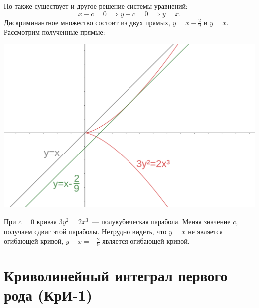 \documentclass[../../main.tex]{subfiles}
\begin{document}
\begin{exmps}
\begin{enumerate}
Но также существует и другое решение системы уравнений:  \[x-c = 0 \implies y 
- c = 0 \implies y = x. \]
Дискриминантное множество состоит из двух прямых, $y  = x - \frac{2}{9}$ и 
$y=x$. Рассмотрим полученные прямые:
\begin{center} \includegraphics[scale=0.5]{hiperbola.png} \end{center}

При $c=0$ кривая $3y^2 = 2x^3$~--- полукубическая парабола. Меняя значение 
$c$, получаем сдвиг этой параболы.
Нетрудно видеть, что $y = x$ не является огибающей кривой, $y - x = 
-\frac{2}{9}$ является огибающей кривой.

\end{enumerate}
\end{exmps}

\section{Криволинейный интеграл первого рода (КрИ-1)}
\end{document}
